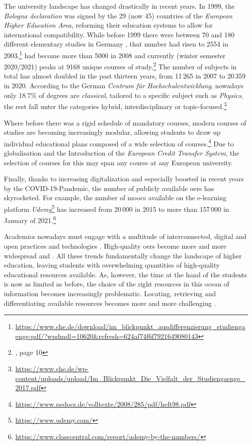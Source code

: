 The university landscape has changed drastically in recent years. In 1999, the \textit{Bologna declaration} was signed by the 29 (now 45) countries of the \textit{European Higher Education Area}, reforming their education systems to allow for international compatibility. While before 1999 there were between 70 and 180 different elementary studies in Germany \cite{Schroder2015}, that number had risen to 2554 in 2003,\footnote{\url{https://www.che.de/download/im_blickpunkt_ausdifferenzierung_studiengaenge-pdf/?wpdmdl=10620&refresh=624af74f6f7921649080143} } had become more than 5000 in 2008 and currently (winter semester 2020/2021) peaks at 9168 unique courses of study.\footnote{\label{fnote:degreenums} , page 10 } The number of subjects in total has almost doubled in the past thirteen years, from 11\,265 in 2007 to 20\,359 in 2020. According to the German \textit{Centrum für Hochschulentwicklung}, nowadays only 18.7\% of degrees are \textit{classical}, \ie tailored to a specific subject such as \textit{Physics}, the rest fall unter the categories hybrid, interdisciplinary or topic-focused.\footnote{\url{https://www.che.de/wp-content/uploads/upload/Im_Blickpunkt_Die_Vielfalt_der_Studiengaenge_2017.pdf} }

Where before there was a rigid schedule of mandatory courses, modern courses of studies are becoming increasingly modular, allowing students to draw up individual educational plans composed of a wide selection of courses.\footnote{\url{https://www.pedocs.de/volltexte/2008/285/pdf/heft98.pdf} } Due to globalisation and the Introduction of the \emph{European Credit Transfer System}, the selection of courses for this may span any course at any European university.

Finally, thanks to increasing digitalization and especially boosted in recent years by the COVID-19-Pandemic, the number of publicly available \glspl{oer} has skyrocketed. For example, the number of \glspl{mooc} available on the e-learning platform \textit{Udemy}\footnote{\url{https://www.udemy.com/}} has increased from 20\,000 in 2015 to more than 157\,000 in January of 2021.\footnote{\url{https://www.classcentral.com/report/udemy-by-the-numbers/} }

Academics nowadays must engage with a multitude of interconnected, digital and open practices and technologies \cite{Atenas2014}. High-quality \glspl{oer} become more and more widespread and  \cite[2]{Olcott2012}. All these trends fundamentally change the landscape of higher education, leaving students with overwhelming quantities of high-quality educational resources available. As, however, the time at the hand of the students is now as limited as before, the choice of the right resources in this ocean of information becomes increasingly problematic. Locating, retrieving and differentiating available resources becomes more and more challenging \cite{Atenas2014}.

